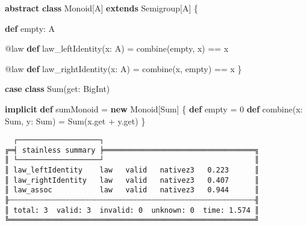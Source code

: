 \documentclass[
  ignorenonframetext,
]{beamer}
\newenvironment{Shaded}{}{}
\newcommand{\DecValTok}[1]{\textcolor[rgb]{0.25,0.63,0.44}{#1}}
\newcommand{\FunctionTok}[1]{\textcolor[rgb]{0.02,0.16,0.49}{#1}}
\newcommand{\KeywordTok}[1]{\textcolor[rgb]{0.00,0.44,0.13}{\textbf{#1}}}
\newcommand{\NormalTok}[1]{#1}
\begin{document}
\begin{frame}[fragile]

\begin{Shaded}
\begin{Highlighting}[]
\KeywordTok{abstract} \KeywordTok{class}\NormalTok{ Monoid[A]}
  \KeywordTok{extends}\NormalTok{ Semigroup[A] \{}

  \KeywordTok{def}\NormalTok{ empty: A}

\NormalTok{  @law }\KeywordTok{def} \FunctionTok{law_leftIdentity}\NormalTok{(x: A) =}
    \FunctionTok{combine}\NormalTok{(empty, x) == x}

\NormalTok{  @law }\KeywordTok{def} \FunctionTok{law_rightIdentity}\NormalTok{(x: A) =}
    \FunctionTok{combine}\NormalTok{(x, empty) == x}
\NormalTok{\}}
\end{Highlighting}
\end{Shaded}

\end{frame}

\begin{frame}[fragile]

\begin{Shaded}
\begin{Highlighting}[]
\KeywordTok{case} \KeywordTok{class} \FunctionTok{Sum}\NormalTok{(get: BigInt)}

\KeywordTok{implicit} \KeywordTok{def}\NormalTok{ sumMonoid = }\KeywordTok{new}\NormalTok{ Monoid[Sum] \{}
  \KeywordTok{def}\NormalTok{ empty = }\DecValTok{0}
  \KeywordTok{def} \FunctionTok{combine}\NormalTok{(x: Sum, y: Sum) = }\FunctionTok{Sum}\NormalTok{(x.}\FunctionTok{get}\NormalTok{ + y.}\FunctionTok{get}\NormalTok{)}
\NormalTok{\}}
\end{Highlighting}
\end{Shaded}

\end{frame}

\begin{frame}[fragile]

\begin{verbatim}
  ┌───────────────────┐
╔═╡ stainless summary ╞═══════════════════════════════════╗
║ └───────────────────┘                                   ║
║ law_leftIdentity    law   valid   nativez3   0.223      ║
║ law_rightIdentity   law   valid   nativez3   0.407      ║
║ law_assoc           law   valid   nativez3   0.944      ║
╟┄┄┄┄┄┄┄┄┄┄┄┄┄┄┄┄┄┄┄┄┄┄┄┄┄┄┄┄┄┄┄┄┄┄┄┄┄┄┄┄┄┄┄┄┄┄┄┄┄┄┄┄┄┄┄┄┄╢
║ total: 3  valid: 3  invalid: 0  unknown: 0  time: 1.574 ║
╚═════════════════════════════════════════════════════════╝
\end{verbatim}

\end{frame}
\end{document}
